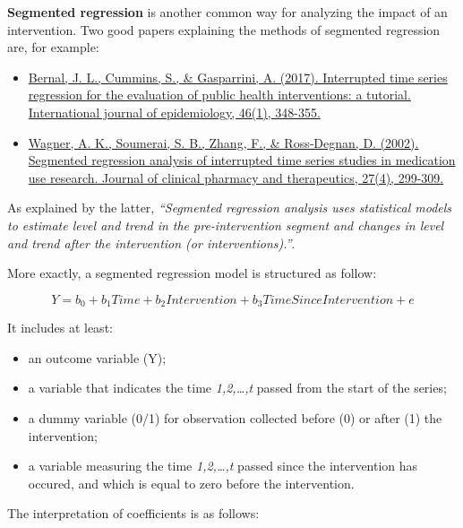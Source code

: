 \documentclass[
]{article}
\providecommand{\tightlist}{%
  \setlength{\itemsep}{0pt}\setlength{\parskip}{0pt}}
\begin{document}
\textbf{Segmented regression} is another common way for analyzing the impact of an intervention. Two good papers explaining the methods of segmented regression are, for example:

\begin{itemize}
\tightlist
\item
  \href{https://academic.oup.com/ije/article/46/1/348/2622842}{Bernal, J. L., Cummins, S., \& Gasparrini, A. (2017). Interrupted time series regression for the evaluation of public health interventions: a tutorial. International journal of epidemiology, 46(1), 348-355.}
\item
  \href{https://www.alnap.org/system/files/content/resource/files/main/segmented-regression-wagner-2002.pdf}{Wagner, A. K., Soumerai, S. B., Zhang, F., \& Ross‐Degnan, D. (2002). Segmented regression analysis of interrupted time series studies in medication use research. Journal of clinical pharmacy and therapeutics, 27(4), 299-309.}
\end{itemize}

As explained by the latter, \emph{``Segmented regression analysis uses statistical models to estimate level and trend in the pre-intervention segment and changes in level and trend after the intervention (or interventions).''}.

More exactly, a segmented regression model is structured as follow:

\[Y = b_0 + b_1Time + b_2Intervention + b_3TimeSinceIntervention + e\]

It includes at least:

\begin{itemize}
\tightlist
\item
  an outcome variable (Y);
\item
  a variable that indicates the time \emph{1,2,\ldots,t} passed from the start of the series;
\item
  a dummy variable (0/1) for observation collected before (0) or after (1) the intervention;
\item
  a variable measuring the time \emph{1,2,\ldots,t} passed since the intervention has occured, and which is equal to zero before the intervention.
\end{itemize}

The interpretation of coefficients is as follows:
\end{document}
